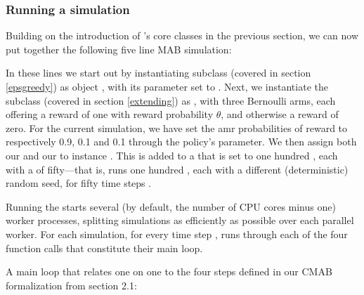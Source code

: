 \documentclass{jss}
\begin{document}
\subsubsection{Running a simulation}

Building on the introduction of 's core classes in the previous section, we can now put together the following five line MAB simulation:

\begin{CodeChunk}
\end{CodeChunk}

In these lines we start out by instantiating  subclass  (covered in section \ref{epsgreedy}) as object , with its  parameter set to . Next, we instantiate the  subclass  (covered in section \ref{extending}) as , with three Bernoulli arms, each offering a reward of one with reward probability $\theta$, and otherwise a reward of zero. For the current simulation, we have set the  amr probabilities of reward to respectively 0.9, 0.1 and 0.1 through the policy's  parameter. We then assign both our  and our  to  instance . This  is  added to a  that is set to one hundred , each with a  of fifty---that is,  runs one hundred , each with a different (deterministic) random seed, for fifty time steps .

Running the  starts several (by default, the number of CPU cores minus one) worker processes, splitting simulations as efficiently as possible over each parallel worker. For each simulation, for every time step ,  runs through each of the four function calls that constitute their main loop.

A main loop that relates one on one to the four steps defined in our CMAB formalization from section 2.1:
\end{document}
